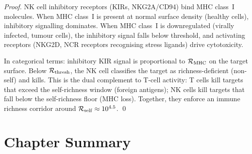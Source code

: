 \begin{proof}
NK cell inhibitory receptors (KIRs, NKG2A/CD94) bind MHC class~I molecules.
When MHC class~I is present at normal surface density (healthy cells),
inhibitory signalling dominates. When MHC class~I is downregulated
(virally infected, tumour cells), the inhibitory signal falls below threshold,
and activating receptors (NKG2D, NCR receptors recognising stress ligands)
drive cytotoxicity.

In categorical terms: inhibitory KIR signal is proportional to
$\mathcal{R}_{\mathrm{MHC}}$ on the target surface. Below $\mathcal{R}_{\mathrm{thresh}}$,
the NK cell classifies the target as richness-deficient (non-self) and kills.
This is the dual complement to T-cell activity: T cells kill targets that
exceed the self-richness window (foreign antigens); NK cells kill targets
that fall below the self-richness floor (MHC loss). Together, they enforce
an immune richness corridor around $\mathcal{R}_{\mathrm{self}} \approx 10^{4.5}$. \qed
\end{proof}

\section*{Chapter Summary}
\label{sec:ch23_summary}


